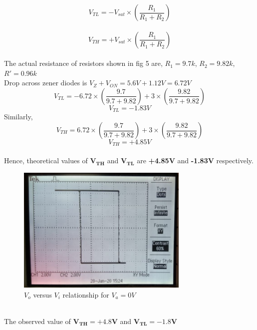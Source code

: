 \documentclass[12pt]{article}
\begin{document}
        \begin{equation}
            V_{TL} = -V_{sat} \times (\frac{R_1}{R_1 + R_2}) 
        \end{equation}
        \\
        \begin{equation}
            V_{TH} = +V_{sat} \times (\frac{R_1}{R_1 + R_2}) 
        \end{equation}
        \\
        The actual resistance of resistors shown in fig 5 are,
        $R_1 = 9.7k$, $R_2 = 9.82k$, $R' = 0.96k$
        \\
        Drop across zener diodes is $V_{Z} + V_{ON} = 5.6V + 1.12V = 6.72V$\\
        \begin{equation}
            V_{TL} = -6.72 \times (\frac{9.7}{9.7 + 9.82}) + 3 \times (\frac{9.82}{9.7 + 9.82})
        \end{equation}
        \begin{equation}
            \boxed{V_{TL} = -1.83V}
        \end{equation}
        Similarly,
        \begin{equation}
            V_{TH} = 6.72 \times (\frac{9.7}{9.7 + 9.82}) + 3 \times (\frac{9.82}{9.7 + 9.82})
        \end{equation}
        \begin{equation}
            \boxed{V_{TH} = +4.85V}
        \end{equation}
        \\
        Hence, theoretical values of $\mathbf{V_{TH}}$ and $\mathbf{V_{TL}}$ are \textbf{+4.85V} and \textbf{-1.83V}   respectively.
        \\
        
        \begin{figure}[H]
            \centering
            \includegraphics[width = 0.6\linewidth, height = 2.4in]{reports/lab2/scmidtt2.jpeg}
            \caption{$V_o$ versus $V_i$ relationship for $V_a = 0V$}
        \end{figure}
        \\
        The observed value of $\mathbf{V_{TH} = +4.8V}$ and $\mathbf{V_{TL} = -1.8V}$\\
\end{document}

